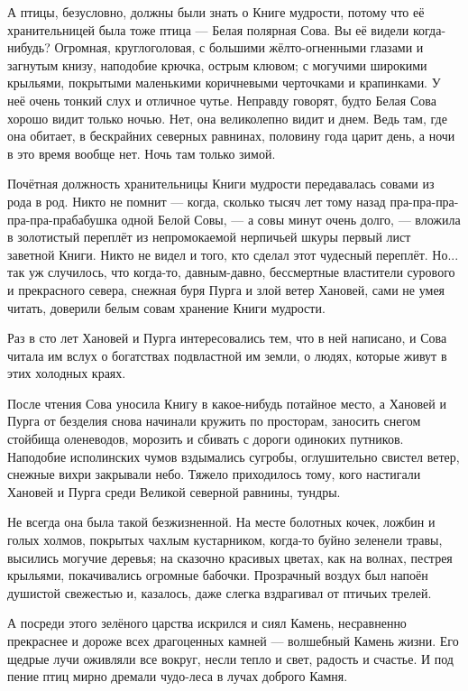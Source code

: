 \documentclass[oneside,final,14pt]{extreport}
\begin{document}
	А птицы, безусловно, должны были знать о Книге мудрости, потому что её хранительницей была тоже птица — Белая полярная Сова. Вы её видели когда-нибудь? Огромная, круглоголовая, с большими жёлто-огненными глазами и загнутым книзу, наподобие крючка, острым клювом; с могучими широкими крыльями, покрытыми маленькими коричневыми черточками и крапинками. У неё очень тонкий слух и отличное чутье. Неправду говорят, будто Белая Сова хорошо видит только ночью. Нет, она великолепно видит и днем. Ведь там, где она обитает, в бескрайних северных равнинах, половину года царит день, а ночи в это время вообще нет. Ночь там только зимой.
	
	Почётная должность хранительницы Книги мудрости передавалась совами из рода в род. Никто не помнит — когда, сколько тысяч лет тому назад пра-пра-пра-пра-пра-прабабушка одной Белой Совы, — а совы минут очень долго, — вложила в золотистый переплёт из непромокаемой нерпичьей шкуры первый лист заветной Книги. Никто не видел и того, кто сделал этот чудесный переплёт. Но... так уж случилось, что когда-то, давным-давно, бессмертные властители сурового и прекрасного севера, снежная буря Пурга и злой ветер Хановей, сами не умея читать, доверили белым совам хранение Книги мудрости.
	
	Раз в сто лет Хановей и Пурга интересовались тем, что в ней написано, и Сова читала им вслух о богатствах подвластной им земли, о людях, которые живут в этих холодных краях.
	
	После чтения Сова уносила Книгу в какое-нибудь потайное место, а Хановей и Пурга от безделия снова начинали кружить по просторам, заносить снегом стойбища оленеводов, морозить и сбивать с дороги одиноких путников. Наподобие исполинских чумов вздымались сугробы, оглушительно свистел ветер, снежные вихри закрывали небо. Тяжело приходилось тому, кого настигали Хановей и Пурга среди Великой северной равнины, тундры.
	
	Не всегда она была такой безжизненной. На месте болотных кочек, ложбин и голых холмов, покрытых чахлым кустарником, когда-то буйно зеленели травы, высились могучие деревья; на сказочно красивых цветах, как на волнах, пестрея крыльями, покачивались огромные бабочки. Прозрачный воздух был напоён душистой свежестью и, казалось, даже слегка вздрагивал от птичьих трелей.
	
	А посреди этого зелёного царства искрился и сиял Камень, несравненно прекраснее и дороже всех драгоценных камней — волшебный Камень жизни. Его щедрые лучи оживляли все вокруг, несли тепло и свет, радость и счастье. И под пение птиц мирно дремали чудо-леса в лучах доброго Камня.
	
\end{document}
